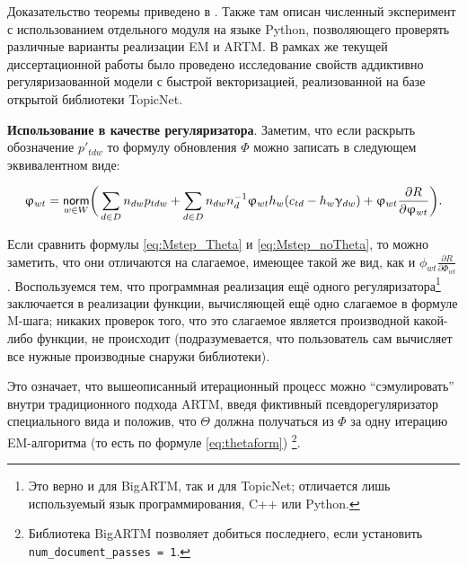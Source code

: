 Доказательство теоремы приведено в \cite{thetaless}. Также там описан численный эксперимент с использованием отдельного модуля на языке Python, позволяющего проверять различные варианты реализации EM и ARTM. В рамках же текущей диссертационной работы было проведено исследование свойств аддиктивно регуляризаованной модели с быстрой векторизацией, реализованной на базе открытой библиотеки TopicNet.

\textbf{Использование в качестве регуляризатора}. Заметим, что если раскрыть обозначение $p'_{tdw}$ то формулу обновления $\Phi$ можно записать в следующем эквивалентном виде:

\begin{equation}
\label{eq:Mstep_noTheta}    
    \upvarphi_{wt} = \mathop{\mathsf{norm}}\limits_{w\in W}
        \biggl(\,
        \sum_{d\in D} n_{dw} p_{tdw}
        + \sum_{d\in D} n_{dw} n_d^{-1} \upvarphi_{wt}h_w (c_{td}-h_w\upgamma_{dw})
        + \upvarphi_{wt} \frac{\partial{R}}{\partial{\ensuremath{\upvarphi}_{wt}}}
        \biggr).
\end{equation}

Если сравнить формулы \ref{eq:Mstep_Theta} и \ref{eq:Mstep_noTheta}, то можно заметить, что они отличаются на слагаемое, имеющее такой же вид, как и $\phi_{wt} \frac{\partial{R}}{\partial{\Phi_{wt}}}$. Воспользуемся тем, что программная реализация ещё одного регуляризатора\footnote{Это верно и для BigARTM, так и для TopicNet; отличается лишь используемый язык программирования, C++ или Python.}  заключается в реализации функции, вычисляющей ещё одно слагаемое в формуле M-шага; никаких проверок того, что это слагаемое является производной какой-либо функции, не происходит (подразумевается, что пользователь сам вычисляет все нужные производные снаружи библиотеки).

Это означает, что вышеописанный итерационный процесс можно ``сэмулировать'' внутри традиционного подхода ARTM, введя фиктивный псевдорегуляризатор специального вида и положив, что $\Theta$ должна получаться из $\Phi$ за одну итерацию EM-алгоритма (то есть по формуле \ref{eq:thetaform}) \footnote{Библиотека BigARTM позволяет добиться последнего, если установить \texttt{num\_document\_passes\ =\ 1}.}.


